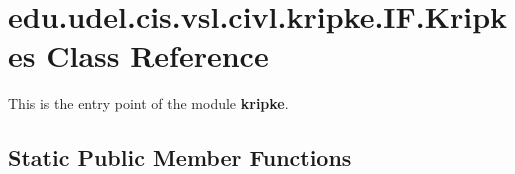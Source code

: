 \hypertarget{classedu_1_1udel_1_1cis_1_1vsl_1_1civl_1_1kripke_1_1IF_1_1Kripkes}{}\section{edu.\+udel.\+cis.\+vsl.\+civl.\+kripke.\+I\+F.\+Kripkes Class Reference}
\label{classedu_1_1udel_1_1cis_1_1vsl_1_1civl_1_1kripke_1_1IF_1_1Kripkes}


This is the entry point of the module {\bfseries kripke}.  


\subsection*{Static Public Member Functions}
